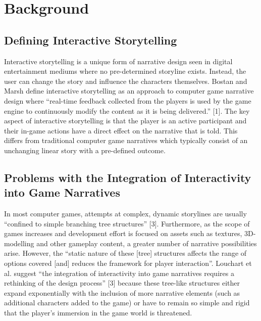 \documentclass{sig-alternate-05-2015}
\begin{document}


\section{Background}

\subsection{Defining Interactive Storytelling}

Interactive storytelling is a unique form of narrative design seen in digital entertainment mediums where no pre-determined storyline exists. Instead, the user can change the story and influence the characters themselves. Bostan and Marsh define interactive storytelling as an approach to computer game narrative design where ``real-time feedback collected from the players is used by the game engine to continuously modify the content as it is being delivered.'' [1]. The key aspect of interactive storytelling is that the player is an active participant and their in-game actions have a direct effect on the narrative that is told. This differs from traditional computer game narratives which typically consist of an unchanging linear story with a pre-defined outcome.

\subsection{Problems with the Integration of Interactivity into Game Narratives}

In most computer games, attempts at complex, dynamic storylines are usually ``confined to simple branching tree structures'' [3]. Furthermore, as the scope of games increases and development effort is focused on assets such as textures, 3D-modelling and other gameplay content, a greater number of narrative possibilities arise. However, the ``static nature of these [tree] structures affects the range of options covered [and] reduces the framework for player interaction''. Louchart et al. suggest ``the integration of interactivity into game narratives requires a rethinking of the design process'' [3] because these tree-like structures either expand exponentially with the inclusion of more narrative elements (such as additional characters added to the game) or have to remain so simple and rigid that the player's immersion in the game world is threatened.
\end{document}

